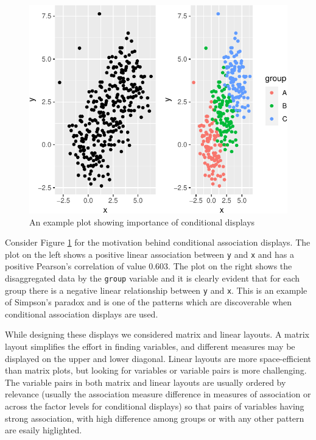\begin{Schunk}
\begin{figure}

{\centering \includegraphics{rj_paper_files/figure-latex/motivation2-1} 

}

\caption[An example plot showing importance of conditional displays]{An example plot showing importance of conditional displays}\label{fig:motivation2}
\end{figure}
\end{Schunk}

Consider Figure \ref{fig:motivation2} for the motivation behind
conditional association displays. The plot on the left shows a positive
linear association between \texttt{y} and \texttt{x} and has a positive
Pearson's correlation of value 0.603. The plot on the right shows the
disaggregated data by the \texttt{group} variable and it is clearly
evident that for each group there is a negative linear relationship
between \texttt{y} and \texttt{x}. This is an example of Simpson's
paradox and is one of the patterns which are discoverable when
conditional association displays are used.

While designing these displays we considered matrix and linear layouts.
A matrix layout simplifies the effort in finding variables, and
different measures may be displayed on the upper and lower diagonal.
Linear layouts are more space-efficient than matrix plots, but looking
for variables or variable pairs is more challenging. The variable pairs
in both matrix and linear layouts are usually ordered by relevance
(usually the association measure difference in measures of association
or across the factor levels for conditional displays) so that pairs of
variables having strong association, with high difference among groups
or with any other pattern are esaily higlighted.

